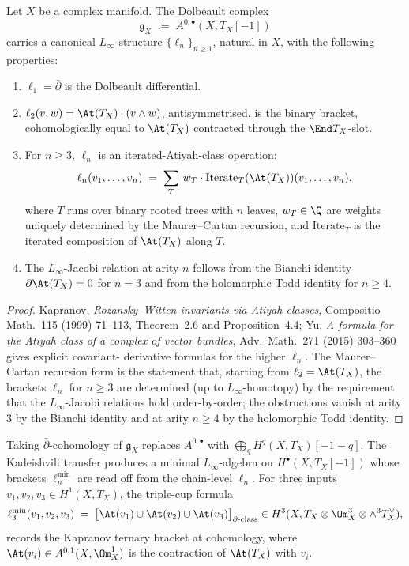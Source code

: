 \begin{theorem}
\label{thm:cycainf-kapranov-linf}
Let $X$ be a complex manifold. The Dolbeault complex
\[
 \mathfrak g_X \;:=\; A^{0,\bullet}(X, T_X[-1])
\]
carries a canonical $L_\infty$-structure $\{\ell_n\}_{n \geq 1}$, natural
in $X$, with the following properties:
\begin{enumerate}
\item $\ell_1 = \bar\partial$ is the Dolbeault differential.
\item $\ell_2(v, w) = \At(T_X) \cdot (v \wedge w)$, antisymmetrised, is
the binary bracket, cohomologically equal to $\At(T_X)$ contracted
through the $\End T_X$-slot.
\item For $n \geq 3$, $\ell_n$ is an iterated-Atiyah-class operation:
\[
 \ell_n(v_1, \ldots, v_n) \;=\; \sum_{T}\, w_T \cdot
 \mathrm{Iterate}_T(\At(T_X))(v_1, \ldots, v_n),
\]
where $T$ runs over binary rooted trees with $n$ leaves, $w_T \in \Q$
are weights uniquely determined by the Maurer--Cartan recursion, and
$\mathrm{Iterate}_T$ is the iterated composition of $\At(T_X)$ along
$T$.
\item The $L_\infty$-Jacobi relation at arity $n$ follows from the
Bianchi identity $\bar\partial \At(T_X) = 0$ for $n = 3$ and from the
holomorphic Todd identity for $n \geq 4$.
\end{enumerate}
\end{theorem}

\begin{proof}
Kapranov, \emph{Rozansky--Witten invariants via Atiyah classes},
Compositio Math.~115 (1999) 71--113, Theorem~2.6 and Proposition~4.4;
Yu, \emph{A formula for the Atiyah class of a complex of vector
bundles}, Adv.\ Math.~271 (2015) 303--360 gives explicit covariant-
derivative formulas for the higher $\ell_n$. The Maurer--Cartan
recursion form is the statement that, starting from $\ell_2 = \At(T_X)$,
the brackets $\ell_n$ for $n \geq 3$ are determined (up to
$L_\infty$-homotopy) by the requirement that the $L_\infty$-Jacobi
relations hold order-by-order; the obstructions vanish at arity $3$ by
the Bianchi identity and at arity $n \geq 4$ by the holomorphic Todd
identity.
\end{proof}

\begin{remark}
\label{rem:cycainf-ell3-min}
Taking $\bar\partial$-cohomology of $\mathfrak g_X$ replaces
$A^{0, \bullet}$ with $\bigoplus_q H^q(X, T_X)[-1-q]$. The Kadeishvili
transfer produces a minimal $L_\infty$-algebra on $H^\bullet(X, T_X[-1])$
whose brackets $\ell_n^{\min}$ are read off from the chain-level
$\ell_n$. For three inputs $v_1, v_2, v_3 \in H^1(X, T_X)$, the
triple-cup formula
\begin{equation}
\label{eq:cycainf-ell3-min-triple-cup}
 \ell_3^{\min}(v_1, v_2, v_3) \;=\; \bigl[\At(v_1) \cup \At(v_2)
 \cup \At(v_3)\bigr]_{\bar\partial\text{-class}}
 \in H^3(X, T_X \otimes \Om^3_X \otimes \wedge^3 T_X^\vee),
\end{equation}
records the Kapranov ternary bracket at cohomology, where
$\At(v_i) \in A^{0,1}(X, \Om^1_X)$ is the contraction of $\At(T_X)$ with
$v_i$.
\end{remark}

